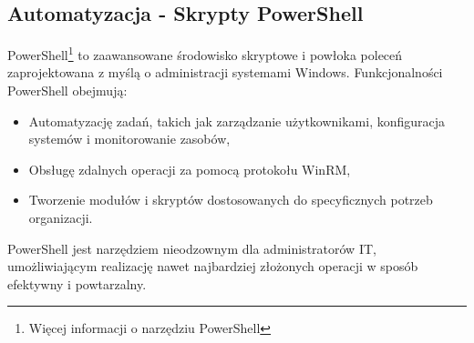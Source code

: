 \subsection{Automatyzacja - Skrypty PowerShell}
PowerShell\footnote{Więcej informacji o narzędziu PowerShell\cite{powershell}} to zaawansowane środowisko skryptowe i powłoka poleceń zaprojektowana z myślą o administracji systemami Windows. Funkcjonalności PowerShell obejmują:
\begin{itemize}
	\item Automatyzację zadań, takich jak zarządzanie użytkownikami, konfiguracja systemów i monitorowanie zasobów,
    \item Obsługę zdalnych operacji za pomocą protokołu WinRM,
    \item Tworzenie modułów i skryptów dostosowanych do specyficznych potrzeb organizacji.
\end{itemize}
PowerShell jest narzędziem nieodzownym dla administratorów IT, umożliwiającym realizację nawet najbardziej złożonych operacji w sposób efektywny i powtarzalny.
